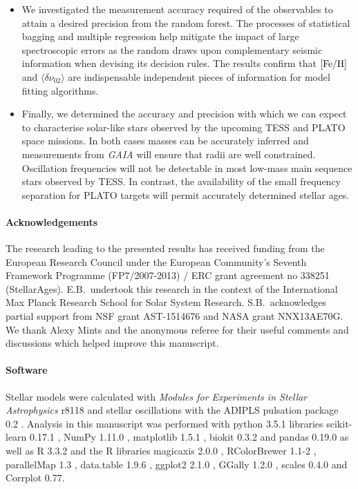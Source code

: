 \begin{itemize}
\item We investigated the measurement accuracy required of the observables to attain a desired precision from the random forest. 
The processes of statistical bagging and multiple regression help mitigate the impact of large spectroscopic errors as the random draws upon complementary seismic information when devising its decision rules. 
The results confirm that $[\rm{Fe/H}]$  and  $\langle\delta\nu_{02}\rangle$ are indispensable independent pieces of information for model fitting algorithms.

\item Finally, we determined the accuracy and precision with which we can expect to characterise solar-like stars observed by the upcoming TESS and PLATO space missions. In both cases masses can be accurately inferred and measurements from \emph{GAIA} will ensure that radii are well constrained. Oscillation frequencies will not be detectable in most low-mass main sequence stars observed by TESS. In contrast, the availability of the small frequency separation for PLATO targets will permit accurately determined stellar ages. 
\end{itemize}





\paragraph*{Acknowledgements}
\noindent The research leading to the presented results has received funding from the European Research Council under the European Community's Seventh Framework Programme (FP7/2007-2013) / ERC grant agreement no 338251 (StellarAges). E.B.\ undertook this research in the context of the International Max Planck Research School for Solar System Research. S.B.\ acknowledges partial support from NSF grant AST-1514676 and NASA grant NNX13AE70G. We thank Alexy Mints and the anonymous referee for their useful comments and discussions which helped improve this manuscript. 


\paragraph*{Software} 
Stellar models were calculated with  \emph{Modules for Experiments in Stellar Astrophysics} r8118 \citep[MESA,][]{2011apjs..192....3p} and stellar oscillations with the ADIPLS pulsation package 0.2 \citep{2008Ap&SS.316..113C}. 
Analysis in this manuscript was performed with python 3.5.1 libraries scikit-learn 0.17.1 \citep{scikit-learn}, NumPy 1.11.0 \citep{van2011numpy}, matplotlib 1.5.1  \citep{Hunter:2007}, biokit 0.3.2 \citep{biokit} and pandas 0.19.0 \citep{mckinney2010data} as well as R 3.3.2 \citep{R} and the R libraries magicaxis 2.0.0 \citep{magicaxis}, RColorBrewer 1.1-2 \citep{RColorBrewer}, parallelMap 1.3 \citep{parallelMap}, data.table 1.9.6 \citep{data.table}, ggplot2 2.1.0 \citep{ggplot2}, GGally 1.2.0 \citep{GGally}, scales 0.4.0 \citep{scales} and  Corrplot 0.77. 

